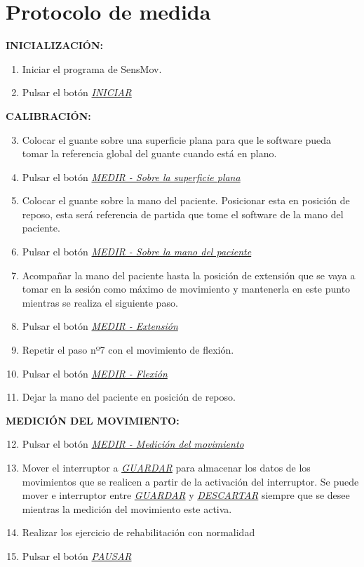 \appendix

\chapter{Protocolo de medida\label{sec:anexo1}}
		
		
		
		\hspace{1cm}\textbf{INICIALIZACIÓN:}
	\begin{enumerate}
		\item Iniciar el programa de SensMov.
		\item Pulsar el botón \textit{\underline{INICIAR}}
	\end{enumerate}	 
		\hspace{1cm}\textbf{CALIBRACIÓN:} 
	\begin{enumerate}
		\setcounter{enumi}{2}
		\item Colocar el guante sobre una superficie plana para que le software pueda tomar la referencia global del guante cuando está en plano.
		\item Pulsar el botón \underline{\textit{MEDIR - Sobre la superficie plana}}
		\item Colocar el guante sobre la mano del paciente. Posicionar esta en posición de reposo, esta será referencia de partida que tome el software de la mano del paciente. 
		\item Pulsar el botón \underline{\textit{MEDIR - Sobre la mano del paciente}}
		\item Acompañar la mano del paciente hasta la posición de extensión que se vaya a tomar en la sesión como máximo de movimiento y mantenerla en este punto mientras se realiza el siguiente paso. 
		\item Pulsar el botón \underline{\textit{MEDIR - Extensión}}
		\item Repetir el paso nº7 con el movimiento de flexión.
		\item Pulsar el botón \underline{\textit{MEDIR - Flexión}}
		\item Dejar la mano del paciente en posición de reposo.
	\end{enumerate}
		\hspace{1cm}\textbf{MEDICIÓN DEL MOVIMIENTO:}
	\begin{enumerate}
		\setcounter{enumi}{11}
		\item Pulsar el botón \underline{\textit{MEDIR - Medición del movimiento}}
		\item Mover el interruptor a \underline{\textit{GUARDAR}} para almacenar los datos de los movimientos que se realicen a partir de la activación del interruptor. Se puede mover e interruptor entre \underline{\textit{GUARDAR}} y \underline{\textit{DESCARTAR}} siempre que se desee mientras la medición del movimiento este activa.  	
		\item Realizar los ejercicio de rehabilitación con normalidad
		\item Pulsar el botón \underline{\textit{PAUSAR}}
	\end{enumerate}
